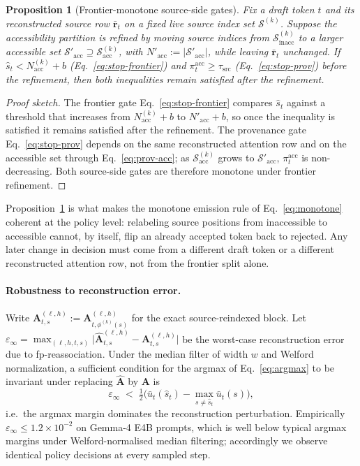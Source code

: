 \documentclass[11pt,twocolumn]{article}
\newtheorem{proposition}{Proposition}
\begin{document}
\begin{proposition}[Frontier-monotone source-side gates]
\label{prop:monotone}
Fix a draft token $t$ and its reconstructed source row
$\bar{\mathbf{r}}_t$ on a fixed live source index set $\mathcal{S}^{(k)}$.
Suppose the accessibility partition is refined by moving source indices from
$\mathcal{S}^{(k)}_{\mathrm{inacc}}$ to a larger accessible set
$\mathcal{S}'_{\mathrm{acc}} \supseteq \mathcal{S}^{(k)}_{\mathrm{acc}}$, with
$N'_{\mathrm{acc}} := |\mathcal{S}'_{\mathrm{acc}}|$, while leaving
$\bar{\mathbf{r}}_t$ unchanged. If
$\hat{s}_t < N^{(k)}_{\mathrm{acc}} + b$
(Eq.~\eqref{eq:stop-frontier}) and
$\pi^{\mathrm{acc}}_t \geq \tau_{\mathrm{src}}$
(Eq.~\eqref{eq:stop-prov}) before the refinement, then both inequalities remain
satisfied after the refinement.
\end{proposition}
\begin{proof}[Proof sketch]
The frontier gate Eq.~\eqref{eq:stop-frontier} compares $\hat{s}_t$ against a
threshold that increases from $N^{(k)}_{\mathrm{acc}} + b$ to
$N'_{\mathrm{acc}} + b$, so once the inequality is satisfied it remains
satisfied after the refinement. The provenance gate
Eq.~\eqref{eq:stop-prov} depends on the same reconstructed attention row and on
the accessible set through Eq.~\eqref{eq:prov-acc}; as
$\mathcal{S}^{(k)}_{\mathrm{acc}}$ grows to $\mathcal{S}'_{\mathrm{acc}}$,
$\pi^{\mathrm{acc}}_t$ is
non-decreasing. Both source-side gates are therefore monotone under frontier
refinement.
\qedhere
\end{proof}

Proposition~\ref{prop:monotone} is what makes the monotone emission rule of
Eq.~\eqref{eq:monotone} coherent at the policy level: relabeling source
positions from inaccessible to accessible cannot, by itself, flip an already
accepted token back to rejected. Any later change in decision must come from a
different draft token or a different reconstructed attention row, not from the
frontier split alone.

\paragraph{Robustness to reconstruction error.}
Write $\mathbf{A}^{(\ell,h)}_{t,s} :=
\mathbf{A}^{(\ell,h)}_{t,\phi^{(k)}(s)}$ for the exact source-reindexed block.
Let $\varepsilon_\infty = \max_{(\ell,h,t,s)} \bigl|
  \widehat{\mathbf{A}}^{(\ell,h)}_{t,s} - \mathbf{A}^{(\ell,h)}_{t,s}\bigr|$
be the worst-case reconstruction error due to fp-reassociation. Under the
median filter of width $w$ and Welford normalization, a sufficient condition
for the argmax of Eq.~\eqref{eq:argmax} to be invariant under replacing
$\widehat{\mathbf{A}}$ by $\mathbf{A}$ is
\begin{equation}
  \varepsilon_\infty \;<\; \tfrac{1}{2} \bigl(\bar{u}_t(\hat{s}_t)
  - \max_{s \neq \hat{s}_t} \bar{u}_t(s)\bigr),
  \label{eq:robust}
\end{equation}
i.e.\ the argmax margin dominates the reconstruction perturbation. Empirically
$\varepsilon_\infty \leq 1.2 \times 10^{-2}$ on Gemma-4 E4B prompts, which is
well below typical argmax margins under Welford-normalised median filtering;
accordingly we observe identical policy decisions at every sampled step.
\end{document}
